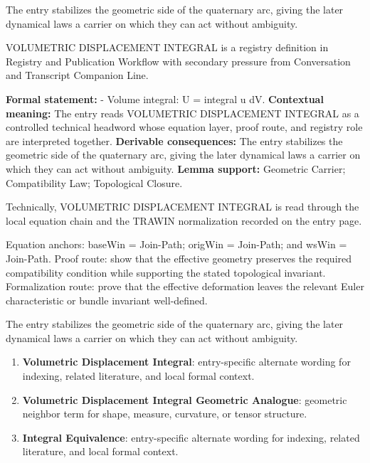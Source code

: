 The entry stabilizes the geometric side of the quaternary arc, giving the later dynamical laws a carrier on which they can act without ambiguity.
\clearpage


\begingroup\small
{}
VOLUMETRIC DISPLACEMENT INTEGRAL is a registry definition in Registry and Publication Workflow with secondary pressure from Conversation and Transcript Companion Line.

\begingroup\footnotesize\setlength{\emergencystretch}{3em}\sloppy
\textbf{Formal statement:} - Volume integral: U = integral u dV. \textbf{Contextual meaning:} The entry reads VOLUMETRIC DISPLACEMENT INTEGRAL as a controlled technical headword whose equation layer, proof route, and registry role are interpreted together. \textbf{Derivable consequences:} The entry stabilizes the geometric side of the quaternary arc, giving the later dynamical laws a carrier on which they can act without ambiguity. \textbf{Lemma support:} Geometric Carrier; Compatibility Law; Topological Closure.\par
\endgroup

Technically, VOLUMETRIC DISPLACEMENT INTEGRAL is read through the local equation chain and the TRAWIN normalization recorded on the entry page.

Equation anchors: baseWin = Join-Path; origWin = Join-Path; and wsWin = Join-Path. Proof route: show that the effective geometry preserves the required compatibility condition while supporting the stated topological invariant. Formalization route: prove that the effective deformation leaves the relevant Euler characteristic or bundle invariant well-defined.

The entry stabilizes the geometric side of the quaternary arc, giving the later dynamical laws a carrier on which they can act without ambiguity.
\endgroup

\begin{enumerate}[leftmargin=1.6em,itemsep=6pt,topsep=4pt]
\item \textbf{Volumetric Displacement Integral}: entry-specific alternate wording for indexing, related literature, and local formal context.
\item \textbf{Volumetric Displacement Integral Geometric Analogue}: geometric neighbor term for shape, measure, curvature, or tensor structure.
\item \textbf{Integral Equivalence}: entry-specific alternate wording for indexing, related literature, and local formal context.
\end{enumerate}

